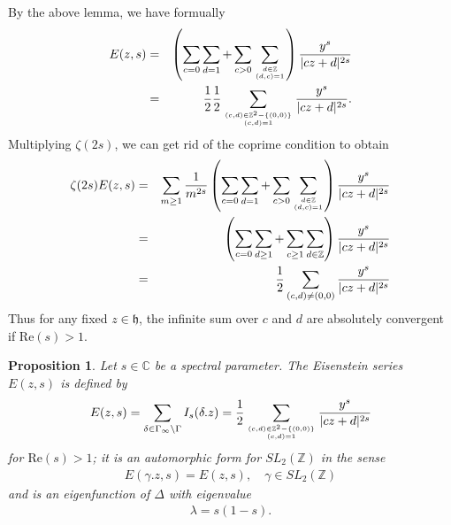 \documentclass[11pt,reqno]{amsart}
\newcommand{\bna}{\begin{eqnarray*}}
\newcommand{\ena}{\end{eqnarray*}}
\newcommand{\mk}{\mathfrak}
\def\re{{\mathrm{Re}}}
\def\C{\mathbb{C}}
\def\Z{\mathbb{Z}}
\newtheorem{prop}[lemma]{Proposition}
\theoremstyle{definition}
\begin{document}
By the above lemma, we have formually
\bna
E(z,s)&=&\left(\sum_{c=0}\sum_{d=1}+\sum_{c> 0}\sum_{d\in\Z\atop (d,c)=1}\right)
\frac{y^s}{|cz+d|^{2s}}\\
&=&\frac{1}{2}\frac{1}{2}\sum_{(c,d)\in \Z^2-\{(0,0)\}\atop (c,d)=1}\frac{y^s}{|cz+d|^{2s}}.
\ena
Multiplying $\zeta(2s)$, we can get rid of the coprime condition to obtain
\bna
\zeta(2s)E(z,s)
&=&\sum_{m\geq 1}\frac{1}{m^{2s}}
\left(\sum_{c=0}\sum_{d=1}+\sum_{c> 0}\sum_{d\in\Z\atop (d,c)=1}\right)
\frac{y^s}{|cz+d|^{2s}}\\
&=&
\left(\sum_{c=0}\sum_{d\geq 1}+
\sum_{c\geq 1}\sum_{d\in\Z}\right)\frac{y^s}{|cz+d|^{2s}}\\
&=&\frac{1}{2}\sum_{(c,d)\neq (0,0)}\frac{y^s}{|cz+d|^{2s}}
\ena
Thus
for any fixed $z\in \mk h$,
the infinite sum over $c$ and $d$ are absolutely convergent if $\re(s)>1$.
\begin{prop}Let $s\in\C$ be a spectral parameter.
 The Eisenstein series $E(z,s)$ is defined by
 \bna
 E(z,s)=\sum_{\delta\in\Gamma_\infty\backslash\Gamma}I_s(\delta.z)
 =\frac{1}{2}\sum_{(c,d)\in \Z^2-\{(0,0)\}\atop(c,d)=1}\frac{y^s}{|cz+d|^{2s}}
 \ena
 for $\re(s)>1$;
it is an automorphic form for $SL_2(\Z)$
in the sense
\bna
E(\gamma.z,s)=E(z,s),\quad\gamma\in SL_2(\Z)
\ena
and is an eigenfunction of $\Delta$
with eigenvalue
\bna
\lambda=s(1-s).
\ena
\end{prop}
\end{document}
